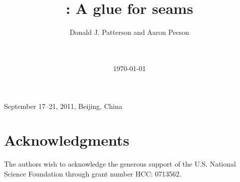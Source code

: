 \documentclass{chi2008}
\title{\Cacophony: A glue for seams}
\author{
\alignauthor
Donald J. Patterson and Aaron Pecson\\
       \affaddr{Department of Informatics}\\
       \affaddr{University of California, Irvine, USA}\\
       \email{ \{djp3,apecson\}@uci.edu}
}
\begin{document}
 {September 17--21, 2011, Beijing, China} 





\date{\today}

\maketitle







\section{Acknowledgments}
The authors wish to acknowledge the generous support of the U.S. National
Science Foundation through grant number HCC: 0713562.



\balancecolumns
\end{document}
